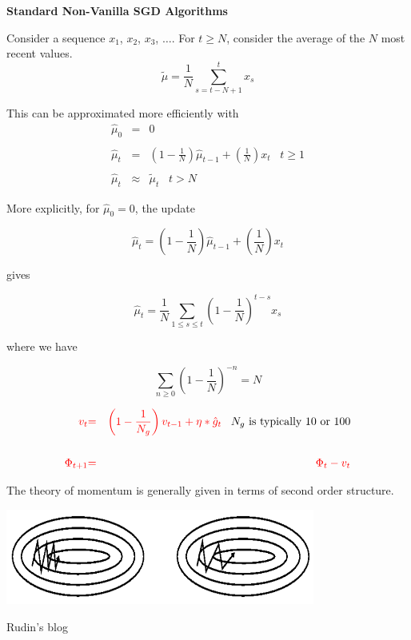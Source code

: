 {\slide{}
\centerline{\bf Standard Non-Vanilla SGD Algorithms}
\vfill
\vfill

Consider a sequence $x_1$, $x_2$, $x_3$, $\ldots$.
\vfill
For $t \geq N$, consider the average of the $N$ most recent values.
$$\tilde{\mu} = \frac{1}{N} \sum_{s=t-N+1}^t x_s$$

\vfill
This can be approximated more efficiently with
\begin{eqnarray*}
\hat{\mu}_0 & = & 0 \\
\\
\hat{\mu}_t & = & \left(1-\frac{1}{N}\right)\hat{\mu}_{t-1} + \left(\frac{1}{N}\right)x_t\;\;\;t \geq 1 \\
\\
\hat{\mu}_t & \approx & \tilde{\mu}_t \;\;\; t >N
\end{eqnarray*}


More explicitly, for $\hat{\mu}_0 = 0$, the update

$$\hat{\mu}_t = \left(1-\frac{1}{N}\right)\hat{\mu}_{t-1} + \left(\frac{1}{N}\right)x_t$$

\vfill
gives

$$\hat{\mu}_t = \frac{1}{N} \sum_{1 \leq s \leq t} \left(1-\frac{1}{N}\right)^{t-s} x_s$$

\vfill
where we have

$$\sum_{n\geq 0} \left(1-\frac{1}{N}\right)^{-n} = N$$


\begin{eqnarray*}
  {\color{red} v_t} & {\color{red} =} & {\color{red} \left(1-\frac{1}{N_g}\right) v_{t-1} + \eta * \hat{g}_t} \;\;\;\mbox{$N_g$ is typically 10 or 100}\\
  \\
  {\color{red} \Phi_{t+1}} & {\color{red} =} & {\color{red} \Phi_t -  v_t} \\
\end{eqnarray*}

The theory of momentum is generally given in terms of second order structure.


\centerline{\includegraphics[width = 4in]{../images/momentum}}
\centerline{\Large Rudin's blog}

}
